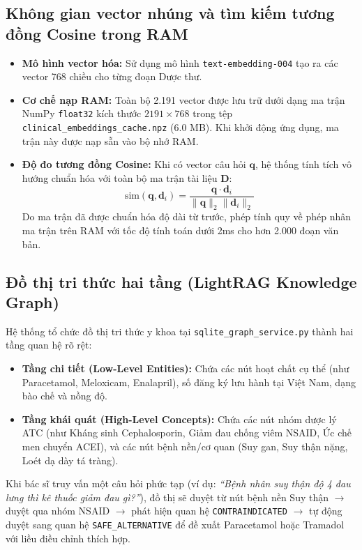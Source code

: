\documentclass[12pt,a4paper]{article}
\begin{document}
\subsection{Không gian vector nhúng và tìm kiếm tương đồng Cosine trong RAM}
\begin{itemize}[leftmargin=1.5em]
    \item \textbf{Mô hình vector hóa:} Sử dụng mô hình \texttt{text-embedding-004} tạo ra các vector 768 chiều cho từng đoạn Dược thư.
    \item \textbf{Cơ chế nạp RAM:} Toàn bộ 2.191 vector được lưu trữ dưới dạng ma trận NumPy \texttt{float32} kích thước $2191 \times 768$ trong tệp \texttt{clinical\_embeddings\_cache.npz} (6.0 MB). Khi khởi động ứng dụng, ma trận này được nạp sẵn vào bộ nhớ RAM.
    \item \textbf{Độ đo tương đồng Cosine:} Khi có vector câu hỏi $\mathbf{q}$, hệ thống tính tích vô hướng chuẩn hóa với toàn bộ ma trận tài liệu $\mathbf{D}$:
    $$\text{sim}(\mathbf{q}, \mathbf{d}_i) = \frac{\mathbf{q} \cdot \mathbf{d}_i}{\|\mathbf{q}\|_2 \|\mathbf{d}_i\|_2}$$
    Do ma trận đã được chuẩn hóa độ dài từ trước, phép tính quy về phép nhân ma trận trên RAM với tốc độ tính toán dưới 2ms cho hơn 2.000 đoạn văn bản.
\end{itemize}

\subsection{Đồ thị tri thức hai tầng (LightRAG Knowledge Graph)}
Hệ thống tổ chức đồ thị tri thức y khoa tại \texttt{sqlite\_graph\_service.py} thành hai tầng quan hệ rõ rệt:
\begin{itemize}[leftmargin=1.5em]
    \item \textbf{Tầng chi tiết (Low-Level Entities):} Chứa các nút hoạt chất cụ thể (như Paracetamol, Meloxicam, Enalapril), số đăng ký lưu hành tại Việt Nam, dạng bào chế và nồng độ.
    \item \textbf{Tầng khái quát (High-Level Concepts):} Chứa các nút nhóm dược lý ATC (như Kháng sinh Cephalosporin, Giảm đau chống viêm NSAID, Ức chế men chuyển ACEI), và các nút bệnh nền/cơ quan (Suy gan, Suy thận nặng, Loét dạ dày tá tràng).
\end{itemize}
Khi bác sĩ truy vấn một câu hỏi phức tạp (ví dụ: \textit{``Bệnh nhân suy thận độ 4 đau lưng thì kê thuốc giảm đau gì?''}), đồ thị sẽ duyệt từ nút bệnh nền Suy thận $\to$ duyệt qua nhóm NSAID $\to$ phát hiện quan hệ \texttt{CONTRAINDICATED} $\to$ tự động duyệt sang quan hệ \texttt{SAFE\_ALTERNATIVE} để đề xuất Paracetamol hoặc Tramadol với liều điều chỉnh thích hợp.
\end{document}
